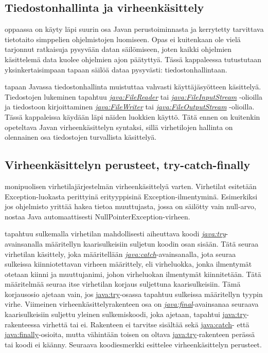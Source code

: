 \documentclass[a4paper,justified,notoc]{tufte-book}
\newcommand{\java}[1]{\underline{\gls{java:#1}}}
\newcommand{\newjava}[1]{\textit{\java{#1}}}
\begin{document}
\begin{fullwidth}
\chapter{Tiedostonhallinta ja virheenkäsittely}
\label{tiedostoista}

 oppaassa on käyty läpi suurin osa Javan perustoiminnasta ja kerrytetty
tarvittava tietotaito simppelien ohjelmistojen luomiseen. Opas ei kuitenkaan ole vielä tarjonnut
ratkaisuja pysyvään datan säilömiseen, joten kaikki ohjelmien käsittelemä data kuolee ohjelmien
ajon päätyttyä. Tässä kappaleessa tutustutaan yksinkertaisimpaan tapaan säilöä dataa pysyvästi:
tiedostonhallintaan. 

 tapaan Javassa tiedostonhallinta muistuttaa vahvasti
käyttäjäsyötteen käsittelyä. Tiedostojen lukeminen tapahtuu \newjava{FileReader} tai
\newjava{FileInputStream} -olioilla ja tiedostoon kirjoittaminen \newjava{FileWriter} tai
\newjava{FileOutputStream} -olioilla. Tässä kappaleissa käydään läpi näiden luokkien käyttö. Tätä
ennen on kuitenkin opeteltava Javan virheenkäsittelyn syntaksi, sillä virhetilojen hallinta on
olennainen osa tiedostojen turvallista käsittelyä.


\section{Virheenkäsittelyn perusteet, try-catch-finally}
\label{try-catch}

 monipuolisen virhetilajärjestelmän virheenkäsittelyä varten. Virhetilat
esitetään Exception-luokasta perittyinä erityyppisinä Exception-ilmentyminä. Esimerkiksi jos
ohjelmisto yrittää hakea tietoa muuttujasta, jossa on säilötty vain null-arvo, nostaa Java
automaattisesti NullPointerException-virheen. 

 tapahtuu sulkemalla virhetilan mahdollisesti aiheuttava koodi
\newjava{try}-avainsanalla määritellyn kaarisulkeisiin suljetun koodin osan sisään. Tätä seuraa
virhetilan käsittely, joka määritellään \newjava{catch}-avainsanalla, jota seuraa sulkeissa
kiinniotettavan virheen määrittely, eli virheluokka, jonka ilmentymät otetaan kiinni ja
muuttujanimi, johon virheluokan ilmentymät kiinnitetään. Tätä määritelmää seuraa itse virhetilan
korjaus suljettuna kaarisulkeisiin. Tämä korjausosio ajetaan vain, jos \java{try}-osassa tapahtuu
sulkeissa määritellyn tyypin virhe. Viimeinen virheenkäsittelyrakenteen osa on
\newjava{final}-avainsanaa seuraava kaarisulkeisiin suljettu yleinen sulkemiskoodi, joka ajetaan,
tapahtui \java{try}-rakenteessa virhettä tai ei. Rakenteen ei tarvitse sisältää sekä \java{catch}-
että \java{finally}-osioita, mutta vähintään toisen on oltava \java{try}-rakenteen perässä tai
koodi ei käänny. Seuraava koodiesmerkki esittelee virheenkäsittelyn perusteet.


\end{fullwidth}
\end{document}
